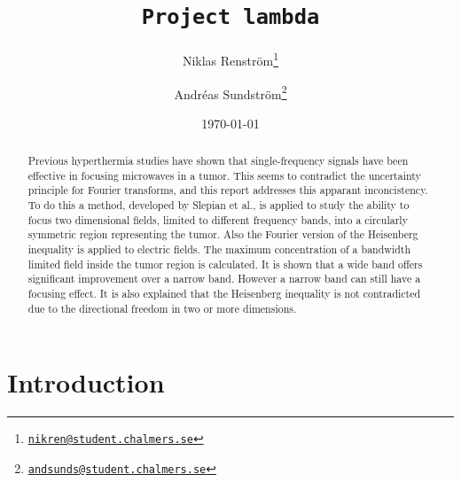 \documentclass[11pt,a4paper, 
swedish,english %
]{article}
\begin{document}


%


\begin{titlepage}
\title{\tt Project lambda}
\author{Niklas Renström\footnote{\href{mailto:nikren@student.chalmers.se}{\tt nikren@student.chalmers.se}} 
\and Andréas Sundström\footnote{\href{mailto:andsunds@student.chalmers.se}{\tt andsunds@student.chalmers.se}}
}

\date{\today}

\maketitle


\thispagestyle{empty} \pagestyle{empty} %

\begin{abstract}
Previous hyperthermia studies have shown that single-frequency signals
have been effective in focusing microwaves in a tumor. This seems to 
contradict the uncertainty principle for Fourier transforms, and this
report addresses this apparant inconcistency. To do this a method,
developed by Slepian et al., is applied to study the ability to focus
two dimensional fields, limited to different frequency bands, into a
circularly symmetric region representing the tumor. Also the Fourier 
version of the Heisenberg inequality is applied to electric fields. 
The maximum concentration of a bandwidth limited field inside the tumor 
region is calculated. It is shown that a wide band offers 
significant improvement over a narrow band. However a narrow band can 
still have a focusing effect.
It is also explained that the Heisenberg inequality is not contradicted due
to the directional freedom in two or more dimensions. 
\end{abstract}
\newpage
\tableofcontents
\end{titlepage}

\setcounter{page}{1}


\section{Introduction}
\end{document}
